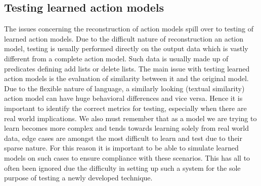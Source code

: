 \subsection{Testing learned action models}
The issues concerning the reconstruction of action models spill over to testing of learned action models. Due to the difficult nature of reconstruction an action model, testing is usually performed directly on the output data which is vastly different from a complete action model. Such data is usually made up of predicates defining add lists or delete lists. The main issue with testing learned action models is the evaluation of similarity between it and the original model. Due to the flexible nature of language, a similarly looking (textual similarity) action model can have huge behavioral differences and vice versa. Hence it is important to identify the correct metrics for testing, especially when there are real world implications. We also must remember that as a model we are trying to learn becomes more complex and tends towards learning solely from real world data, edge cases are amongst the most difficult to learn and test due to their sparse nature. For this reason it is important to be able to simulate learned models on such cases to ensure compliance with these scenarios. This has all to often been ignored due the difficulty in setting up such a system for the sole purpose of testing a newly developed technique.
